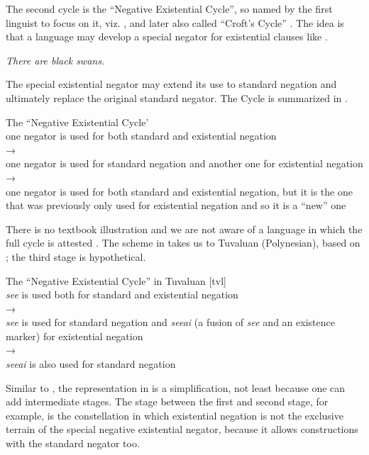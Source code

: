 ﻿\documentclass[output=paper]{langsci/langscibook}
\begin{document}
The second cycle is the ``Negative Existential Cycle'', so named by the
first linguist to focus on it, viz. \textcite[6]{Croft1991}, and later also
called ``Croft's Cycle'' \parencite[e.g.][73]{Kahrel1996}. The idea is that
a language may develop a special negator for existential clauses like
.
%
\begin{exe}\ex\label{ex:int-swans}
    \textit{There are black swans.}
    \end{exe}
%
The special existential negator may extend its use to standard negation and
ultimately replace the original standard negator. The Cycle is summarized
in .
%
\begin{exe}\ex\label{ex:int-nec}
          The ``Negative Existential Cycle'\\[1ex]
one negator is used for both standard and existential negation  \\
→\\
one negator is used for standard negation and another one for existential
negation\\
→\\
one negator is used for both standard and existential negation, but it is
the one that was previously only used for existential negation and so it is
a ``new'' one
  \end{exe}
%
There is no textbook illustration and we are not aware of a language in
which the full cycle is attested \parencite[see
also][]{Veselinova2014}. The scheme in
 takes us to Tuvaluan (Polynesian),
based on \textcite[1345--1346]{Veselinova2014}; the third stage is
hypothetical.
%
\begin{exe}\ex\label{ex:int-nec-tuvaluan}
          The ``Negative Existential Cycle'' in Tuvaluan [tvl]\\[1ex]
\textit{see} is used both for standard and existential negation\\ 
→\\ 
\textit{see} is used for standard negation and \textit{seeai} (a fusion of
\textit{see} and an existence marker) for existential negation\\
→ \\
\textit{seeai} is also used for standard negation
\end{exe}
%
Similar to , the representation in  is a
simplification, not least because one can add intermediate stages. The
stage between the first and second stage, for example, is the constellation
in which existential negation is not the exclusive terrain of the special
negative existential negator, because it allows constructions with the
standard negator too. 
\end{document}
